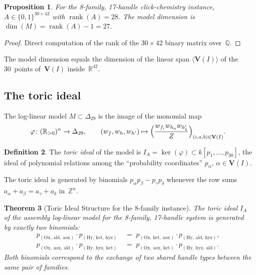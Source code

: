 \documentclass[preprint,12pt]{elsarticle}
\newtheorem{theorem}{Theorem}[section]
\newtheorem{proposition}[theorem]{Proposition}
\theoremstyle{definition}
\newtheorem{definition}[theorem]{Definition}
\theoremstyle{remark}
\newcommand{\kk}{k}
\newcommand{\QQ}{\mathbb{Q}}
\newcommand{\ZZ}{\mathbb{Z}}
\newcommand{\RR}{\mathbb{R}}
\newcommand{\Var}{\mathbf{V}}
\DeclareMathOperator{\rank}{rank}
\begin{document}
\begin{proposition}\label{prop:rank}
For the 8-family, 17-handle click-chemistry instance,
$A \in \{0,1\}^{30 \times 42}$ with $\rank(A) = 28$.
The model dimension is $\dim(M) = \rank(A) - 1 = 27$.
\end{proposition}

\begin{proof}
Direct computation of the rank of the $30 \times 42$ binary
matrix over~$\QQ$.
\end{proof}

The model dimension equals the dimension of the linear span
$\langle \Var(I) \rangle$ of the 30~points of~$\Var(I)$
inside~$\RR^{42}$.


\subsection{The toric ideal}

The log-linear model $M \subset \Delta_{29}$ is the image
of the monomial map
\[
  \varphi \colon (\RR_{>0})^n \to \Delta_{29}, \qquad
  (w_f, w_h, w_{h'}) \mapsto
  \Bigl(\frac{w_{f_i} w_{h_a} w_{h'_b}}{Z}\Bigr)_{(i,a,b) \in \Var(I)}.
\]

\begin{definition}
The \emph{toric ideal} of the model is
$I_A = \ker(\varphi) \subset \kk[p_1, \ldots, p_{30}]$,
the ideal of polynomial relations among the
``probability coordinates'' $p_\alpha$, $\alpha \in \Var(I)$.
\end{definition}

The toric ideal is generated by binomials
$p_\alpha p_\beta - p_\gamma p_\delta$ whenever the
row sums $a_\alpha + a_\beta = a_\gamma + a_\delta$
in~$\ZZ^n$.

\begin{theorem}[Toric Ideal Structure for the 8-family instance]\label{thm:toric}
The toric ideal $I_A$ of the assembly log-linear model for the
8-family, 17-handle system is generated by exactly two binomials:
\begin{align*}
  p_{(\mathrm{Ox},\,\mathrm{ald},\,\mathrm{aox})} \cdot
  p_{(\mathrm{Hy},\,\mathrm{ket},\,\mathrm{hyz})}
  &\;=\;
  p_{(\mathrm{Ox},\,\mathrm{ket},\,\mathrm{aox})} \cdot
  p_{(\mathrm{Hy},\,\mathrm{ald},\,\mathrm{hyz})}, \\[3pt]
  p_{(\mathrm{Ox},\,\mathrm{aox},\,\mathrm{ald})} \cdot
  p_{(\mathrm{Hy},\,\mathrm{hyz},\,\mathrm{ket})}
  &\;=\;
  p_{(\mathrm{Ox},\,\mathrm{aox},\,\mathrm{ket})} \cdot
  p_{(\mathrm{Hy},\,\mathrm{hyz},\,\mathrm{ald})}.
\end{align*}
Both binomials correspond to the exchange of two shared
handle types between the same pair of families.
\end{theorem}
\end{document}
